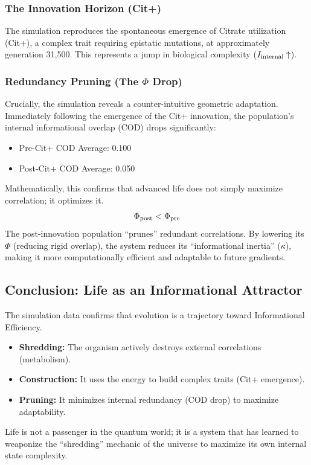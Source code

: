 \documentclass{article}
\begin{document}
\subsubsection{The Innovation Horizon (Cit+)}
The simulation reproduces the spontaneous emergence of Citrate utilization (Cit+), a complex trait requiring epistatic mutations, at approximately generation 31,500. This represents a jump in biological complexity ($I_{\rm internal} \uparrow$).

\subsubsection{Redundancy Pruning (The $\Phi$ Drop)}
Crucially, the simulation reveals a counter-intuitive geometric adaptation. Immediately following the emergence of the Cit+ innovation, the population's internal informational overlap (COD) drops significantly:
\begin{itemize}
    \item Pre-Cit+ COD Average: 0.100
    \item Post-Cit+ COD Average: 0.050
\end{itemize}
Mathematically, this confirms that advanced life does not simply maximize correlation; it optimizes it.
\begin{equation}
    \Phi_{\rm post} < \Phi_{\rm pre}
\end{equation}
The post-innovation population ``prunes'' redundant correlations. By lowering its $\Phi$ (reducing rigid overlap), the system reduces its ``informational inertia'' ($\kappa$), making it more computationally efficient and adaptable to future gradients.

\subsection{Conclusion: Life as an Informational Attractor}
The simulation data confirms that evolution is a trajectory toward Informational Efficiency.
\begin{itemize}
    \item \textbf{Shredding:} The organism actively destroys external correlations (metabolism).
    \item \textbf{Construction:} It uses the energy to build complex traits (Cit+ emergence).
    \item \textbf{Pruning:} It minimizes internal redundancy (COD drop) to maximize adaptability.
\end{itemize}
Life is not a passenger in the quantum world; it is a system that has learned to weaponize the ``shredding'' mechanic of the universe to maximize its own internal state complexity.
\end{document}
